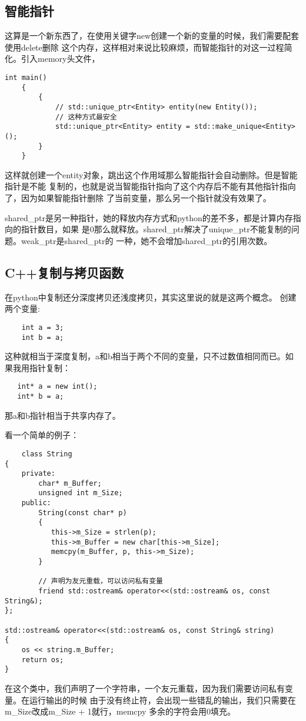 \documentclass{article}
\begin{document}
\begin{sloppypar}
\subsection{智能指针}
这算是一个新东西了，在使用关键字new创建一个新的变量的时候，我们需要配套使用delete删除
这个内存，这样相对来说比较麻烦，而智能指针的对这一过程简化。引入memory头文件，
\begin{lstlisting}
int main()
	{
		{
			// std::unique_ptr<Entity> entity(new Entity());
			// 这种方式最安全
			std::unique_ptr<Entity> entity = std::make_unique<Entity>(); 
		}
	}
\end{lstlisting}
这样就创建一个entity对象，跳出这个作用域那么智能指针会自动删除。但是智能指针是不能
复制的，也就是说当智能指针指向了这个内存后不能有其他指针指向了，因为如果智能指针删除
了当前变量，那么另一个指针就没有效果了。

shared\_ptr是另一种指针，她的释放内存方式和python的差不多，都是计算内存指向的指针数目，如果
是0那么就释放。shared\_ptr解决了unique\_ptr不能复制的问题。weak\_ptr是shared\_ptr的
一种，她不会增加shared\_ptr的引用次数。

\subsection{C++复制与拷贝函数}
在python中复制还分深度拷贝还浅度拷贝，其实这里说的就是这两个概念。
创建两个变量:
\begin{lstlisting}
	int a = 3;
    int b = a;
\end{lstlisting}
这种就相当于深度复制，a和b相当于两个不同的变量，只不过数值相同而已。如果我用指针复制：
\begin{lstlisting}
   int* a = new int();
   int* b = a;
\end{lstlisting}
那a和b指针相当于共享内存了。

看一个简单的例子：
\begin{lstlisting}
	class String
{
    private:
        char* m_Buffer;
        unsigned int m_Size;
    public:
        String(const char* p)
        {
           this->m_Size = strlen(p);
           this->m_Buffer = new char[this->m_Size];
           memcpy(m_Buffer, p, this->m_Size);
        }
        
        // 声明为友元重载，可以访问私有变量
        friend std::ostream& operator<<(std::ostream& os, const String&);
};

std::ostream& operator<<(std::ostream& os, const String& string)
{ 
    os << string.m_Buffer;
    return os;
}
\end{lstlisting}
在这个类中，我们声明了一个字符串，一个友元重载，因为我们需要访问私有变量。在运行输出的时候
由于没有终止符，会出现一些错乱的输出，我们只需要在m\_Size改成m\_Size + 1就行，memcpy
多余的字符会用0填充。


\end{sloppypar}
\end{document}
